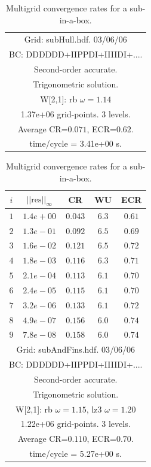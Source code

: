 \begin{table}[hbt]
\begin{center}
{\begin{tabular}{|c|c|c|c|c|}
\hline 
\multicolumn{5}{|c|}{Grid: subHull.hdf. 03/06/06}  \\
\multicolumn{5}{|c|}{BC: DDDDDD+IIPPDI+IIIIDI+....}  \\
\multicolumn{5}{|c|}{Second-order accurate.}  \\
\multicolumn{5}{|c|}{Trigonometric solution.}  \\
\multicolumn{5}{|c|}{W[2,1]: rb $\omega=1.14$}  \\
\multicolumn{5}{|c|}{1.37e+06 grid-points. 3 levels.}  \\
\multicolumn{5}{|c|}{Average CR=$0.071$, ECR=$0.62$.}  \\
\multicolumn{5}{|c|}{time/cycle = 3.41e+00 s.}  \\
\hline 
\end{tabular}
\begin{tabular}{|c|c|c|c|c|} \hline 
 $i$   & $\vert\vert\mbox{res}\vert\vert_\infty$  &  CR     &  WU    & ECR  \\   \hline 
 $ 1$  & $ 1.4e+00$ & $0.043$ & $ 6.3$ & $0.61$ \\ 
 $ 2$  & $ 1.3e-01$ & $0.092$ & $ 6.5$ & $0.69$ \\ 
 $ 3$  & $ 1.6e-02$ & $0.121$ & $ 6.5$ & $0.72$ \\ 
 $ 4$  & $ 1.8e-03$ & $0.116$ & $ 6.3$ & $0.71$ \\ 
 $ 5$  & $ 2.1e-04$ & $0.113$ & $ 6.1$ & $0.70$ \\ 
 $ 6$  & $ 2.4e-05$ & $0.115$ & $ 6.1$ & $0.70$ \\ 
 $ 7$  & $ 3.2e-06$ & $0.133$ & $ 6.1$ & $0.72$ \\ 
 $ 8$  & $ 4.9e-07$ & $0.156$ & $ 6.0$ & $0.74$ \\ 
 $ 9$  & $ 7.8e-08$ & $0.158$ & $ 6.0$ & $0.74$ \\ 
\hline 
\multicolumn{5}{|c|}{Grid: subAndFins.hdf. 03/06/06}  \\
\multicolumn{5}{|c|}{BC: DDDDDD+IIPPDI+IIIIDI+....}  \\
\multicolumn{5}{|c|}{Second-order accurate.}  \\
\multicolumn{5}{|c|}{Trigonometric solution.}  \\
\multicolumn{5}{|c|}{W[2,1]: rb $\omega=1.15$, lz3 $\omega=1.20$}  \\
\multicolumn{5}{|c|}{1.22e+06 grid-points. 3 levels.}  \\
\multicolumn{5}{|c|}{Average CR=$0.110$, ECR=$0.70$.}  \\
\multicolumn{5}{|c|}{time/cycle = 5.27e+00 s.}  \\
\hline 
\end{tabular}
} %
\end{center}
\caption{Multigrid convergence rates for a sub-in-a-box.}
\label{fig:smoothBox}
\end{table}

